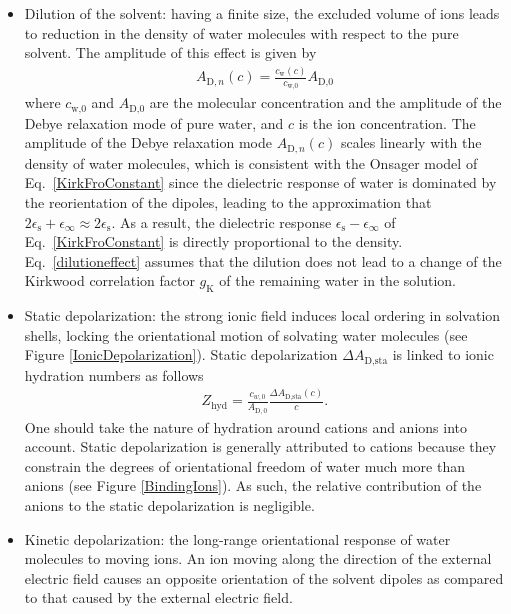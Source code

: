 \begin{itemize}
	\setlength{\itemsep}{0pt}%
	\item{Dilution of the solvent: having a finite size, the excluded volume of ions leads to reduction in the density of water molecules with respect to the pure solvent.\!\cite{Onsager1936,BOTTCHER1973,Liszi1988} The amplitude of this effect is given by
	\begin{eqnarray}
	A_{\text{D},n} (c) = \frac{c_\text{w} (c)}{c_\text{w,0}} A_\text{D,0} 
	\label{dilutioneffect}
	\end{eqnarray}
	where $c_\text{w,0}$ and $A_\text{D,0}$ are the molecular concentration and the amplitude of the Debye relaxation mode of pure water, and $c$ is the ion concentration. The amplitude of the Debye relaxation mode $A_{\text{D},n} (c)$ scales linearly with the density of water molecules, which is consistent with the Onsager model of Eq.~\ref{KirkFroConstant} since the dielectric response of water is dominated by the reorientation of the dipoles, leading to the approximation that $2 \epsilon_\text{s} + \epsilon_\infty \approx 2 \epsilon_\text{s}$. As a result, the dielectric response $\epsilon_\text{s} - \epsilon_\infty$ of Eq.~\ref{KirkFroConstant} is directly proportional to the density. Eq.~\ref{dilutioneffect} assumes that the dilution does not lead to a change of the Kirkwood correlation factor $g_\text{K}$ of the remaining water in the solution.}
	





	\item{Static depolarization: the strong ionic field induces local ordering in solvation shells, locking the orientational motion of solvating water molecules\!\cite{Impey1983,Barthel1992} (see Figure \ref{IonicDepolarization}). Static depolarization $\Delta A_{\text{D,sta}}$ is linked to ionic hydration numbers\!\cite{Buchner2008} as follows
	\begin{eqnarray}
	Z_\text{hyd} = \frac{c_{w,0}}{A_{\text{D},0}} \frac{\Delta A_{\text{D,sta}} (c) }{c}.
	\end{eqnarray}
	One should take the nature of hydration around cations and anions into account. Static depolarization is generally attributed to cations because they constrain the degrees of orientational freedom of water much more than anions (see Figure \ref{BindingIons}). As such, the relative contribution of the anions to the static depolarization is negligible.\!\cite{Barthel1992,Buchner1999,Impey1983,Guardia1990,Ohtaki1993,Smith1994,Wachter2007}}

	\item{Kinetic depolarization: the long-range orientational response of water molecules to moving ions. An ion moving along the direction of the external electric field causes an opposite orientation of the solvent dipoles as compared to that caused by the external electric field.\!\cite{Hubbard1977a,Hubbard1977,Hubbard1978c,Hubbard1979a,VanderZwan1982,VanderZwan1983a}}
\end{itemize}



